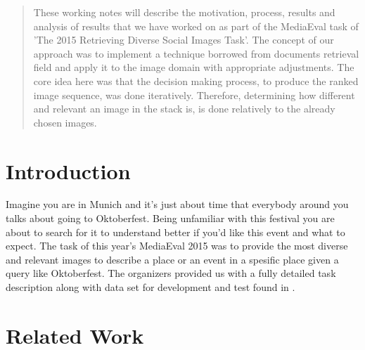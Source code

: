 \documentclass{sig-alternate}
\begin{document}
{\date{20 Agoust 2015}

\maketitle
\begin{abstract}
These working notes will describe the motivation, process, results and 
analysis of results that we have worked on as part of the 
MediaEval task of 'The 2015 Retrieving Diverse Social Images Task'. 
The concept of our approach was to implement a technique \cite{fscore} borrowed from documents retrieval field 
and apply it to the image domain with appropriate adjustments. 
The core idea here was that the decision making process, to produce the ranked image sequence, 
was done iteratively. Therefore, determining how different and relevant an image in 
the stack is, is done relatively to the already chosen images. 

\end{abstract}


\section{Introduction}
Imagine you are in Munich and it's just about time that everybody around you talks about going to 
Oktoberfest. Being unfamiliar with this festival you are about to search for it to understand better if 
you'd like this event and what to expect. The task of this year's MediaEval 2015 was to provide the most
diverse and relevant images to describe a place or an event in a spesific place given a query like Oktoberfest.
The organizers provided us with a fully detailed task description along with data set for development and test 
found in \cite{mediaEval2015}.


\section{Related Work}
\label{section:rw}

}
\end{document}

